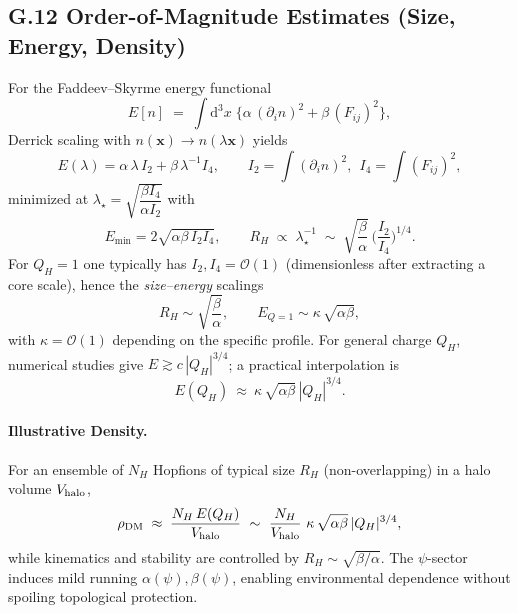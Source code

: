 \subsection*{G.12 Order-of-Magnitude Estimates (Size, Energy, Density)}
For the Faddeev--Skyrme energy functional
\begin{equation}
E[n] \;=\; \int\!\mathrm{d}^3x\;\Big\{\alpha\, (\partial_i n)^2 + \beta\, (F_{ij})^2\Big\},
\end{equation}
Derrick scaling with $n(\mathbf{x})\to n(\lambda \mathbf{x})$ yields
\begin{equation}
E(\lambda)= \alpha\, \lambda\, I_2 + \beta\, \lambda^{-1} I_4,\qquad
I_2=\!\int\! (\partial_i n)^2,\ \ I_4=\!\int\! (F_{ij})^2,
\end{equation}
minimized at $\lambda_\star=\sqrt{\dfrac{\beta I_4}{\alpha I_2}}$ with
\begin{equation}
E_{\min}=2\sqrt{\alpha\beta\, I_2 I_4},\qquad
R_H \;\propto\; \lambda_\star^{-1} \;\sim\; \sqrt{\frac{\beta}{\alpha}}\, \Big(\frac{I_2}{I_4}\Big)^{1/4}.
\end{equation}
For $Q_H=1$ one typically has $I_2,I_4=\mathcal{O}(1)$ (dimensionless after extracting a core scale), hence the \emph{size--energy} scalings
\begin{equation}
R_H \sim \sqrt{\frac{\beta}{\alpha}},\qquad E_{Q=1} \sim \kappa\, \sqrt{\alpha\beta},
\end{equation}
with $\kappa=\mathcal{O}(1)$ depending on the specific profile. For general charge $Q_H$, numerical studies give $E \gtrsim c\,|Q_H|^{3/4}$; a practical interpolation is
\begin{equation}
E(Q_H)\ \approx\ \kappa\, \sqrt{\alpha\beta}\, |Q_H|^{3/4}.
\end{equation}
\paragraph{Illustrative Density.} For an ensemble of $N_H$ Hopfions of typical size $R_H$ (non-overlapping) in a halo volume $V_{\rm halo}$,
\begin{equation}
\rho_{\rm DM} \;\approx\; \frac{N_H\, E(Q_H)}{V_{\rm halo}} \ \sim\  \frac{N_H}{V_{\rm halo}}\ \kappa\, \sqrt{\alpha\beta}\, |Q_H|^{3/4},
\end{equation}
while kinematics and stability are controlled by $R_H\!\sim\!\sqrt{\beta/\alpha}$. The $\psi$-sector induces mild running $\alpha(\psi),\beta(\psi)$, enabling environmental dependence without spoiling topological protection.

